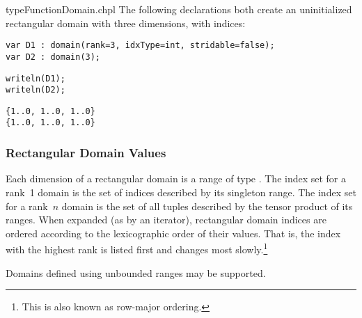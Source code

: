 \begin{chapelexample}{typeFunctionDomain.chpl}
The following declarations both create an uninitialized rectangular domain with three dimensions, with  indices:
\begin{chapel}
\begin{verbatim}
var D1 : domain(rank=3, idxType=int, stridable=false);
var D2 : domain(3);
\end{verbatim}
\end{chapel}
\begin{chapelpost}
\begin{verbatim}
writeln(D1);
writeln(D2);
\end{verbatim}
\end{chapelpost}
\begin{chapeloutput}
\begin{verbatim}
{1..0, 1..0, 1..0}
{1..0, 1..0, 1..0}
\end{verbatim}
\end{chapeloutput}
\end{chapelexample}

\subsubsection{Rectangular Domain Values}
\label{Rectangular_Domain_Values}

Each dimension of a rectangular domain is a range of
type .
The index set for a rank~1 domain is the set of indices
described by its singleton range.  The index set for a rank~$n$
domain is the set of all  tuples described by the
tensor product of its ranges.  When expanded (as by an iterator), rectangular domain indices are ordered
according to the lexicographic order of their values.  That is, the index with
the highest rank is listed first and changes most slowly.\footnote{This is also
known as row-major ordering.}



\begin{future}
Domains defined using unbounded ranges may be supported.
\end{future}

